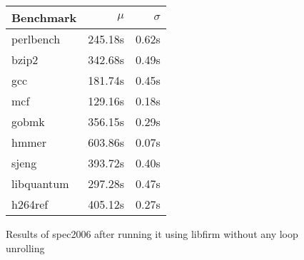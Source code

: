 \begin{figure}[h]
    \begin{center}
        \begin{tabular}{lrr}
            \toprule
            Benchmark & $\mu$ & $\sigma$\\
            \midrule
            perlbench & 245.18s & 0.62s\\
            bzip2 & 342.68s & 0.49s\\
            gcc & 181.74s & 0.45s\\
            mcf & 129.16s & 0.18s\\
            gobmk & 356.15s & 0.29s\\
            hmmer & 603.86s & 0.07s\\
            sjeng & 393.72s & 0.40s\\
            libquantum & 297.28s & 0.47s\\
            h264ref & 405.12s & 0.27s\\
            \bottomrule
        \end{tabular}
    \end{center}
    \caption{Results of spec2006 after running it using libfirm without any loop unrolling}
    \label{fig:eval:perf:ref}
\end{figure}